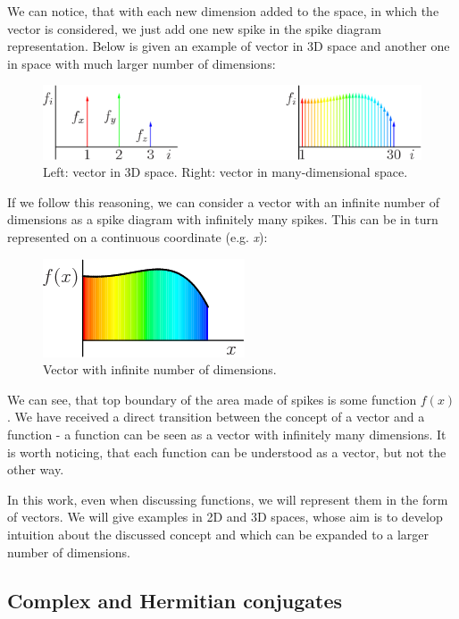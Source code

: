 We can notice, that with each new dimension added to the space, in which the vector is considered, we just add one new spike in the spike diagram representation. Below is given an example of vector in 3D space and another one in space with much larger number of dimensions:

\begin{figure}[ht]
\centering
\includegraphics[scale=0.75]{function_as_vector3}
\caption{Left: vector in 3D space. Right: vector in many-dimensional space.}
\end{figure}

If we follow this reasoning, we can consider a vector with an infinite number of dimensions as a spike diagram with infinitely many spikes. This can be in turn represented on a continuous coordinate (e.g. \textit{x}):

\begin{figure}[ht]
\centering
\includegraphics{function_as_vector4}
\caption{Vector with infinite number of dimensions.}
\end{figure}

We can see, that top boundary of the area made of spikes is some function $f(x)$. We have received a direct transition between the concept of a vector and a function - a function can be seen as a vector with infinitely many dimensions. It is worth noticing, that each function can be understood as a vector, but not the other way.

In this work, even when discussing functions, we will represent them in the form of vectors. We will give examples in 2D and 3D spaces, whose aim is to develop intuition about the discussed concept and which can be expanded to a larger number of dimensions.

\subsection{Complex and Hermitian conjugates}

